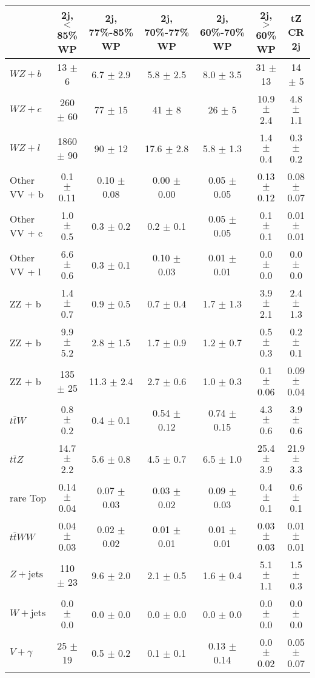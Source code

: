 \begin{tabular}{|l|c|c|c|c|c|c|}
\hline 
 & {2j, $<$85\% WP} & {2j, 77\%-85\% WP} & {2j, 70\%-77\% WP} & {2j, 60\%-70\% WP} & {2j, $>$60\% WP} & {tZ CR 2j}\\
\hline 
  $WZ + b$   & 13 $\pm$ 6 & 6.7 $\pm$ 2.9 & 5.8 $\pm$ 2.5 & 8.0 $\pm$ 3.5 & 31 $\pm$ 13 & 14 $\pm$ 5 \\ 
  $WZ + c$   & 260 $\pm$ 60 & 77 $\pm$ 15 & 41 $\pm$ 8 & 26 $\pm$ 5 & 10.9 $\pm$ 2.4 & 4.8 $\pm$ 1.1 \\ 
  $WZ + l$   & 1860 $\pm$ 90 & 90 $\pm$ 12 & 17.6 $\pm$ 2.8 & 5.8 $\pm$ 1.3 & 1.4 $\pm$ 0.4 & 0.3 $\pm$ 0.2 \\ 
  Other VV + b   & 0.1 $\pm$ 0.11 & 0.10 $\pm$ 0.08 & 0.00 $\pm$ 0.00 & 0.05 $\pm$ 0.05 & 0.13 $\pm$ 0.12 & 0.08 $\pm$ 0.07 \\ 
  Other VV + c  & 1.0 $\pm$ 0.5 & 0.3 $\pm$ 0.2 & 0.2 $\pm$ 0.1 & 0.05 $\pm$ 0.05 & 0.1 $\pm$ 0.1 & 0.01 $\pm$ 0.01 \\ 
  Other VV + l   & 6.6 $\pm$ 0.6 & 0.3 $\pm$ 0.1 & 0.10 $\pm$ 0.03 & 0.01 $\pm$ 0.01 & 0.0 $\pm$ 0.0 & 0.0 $\pm$ 0.0 \\ 
  ZZ + b   & 1.4 $\pm$ 0.7 & 0.9 $\pm$ 0.5 & 0.7 $\pm$ 0.4 & 1.7 $\pm$ 1.3 & 3.9 $\pm$ 2.1 & 2.4 $\pm$ 1.3 \\ 
  ZZ + b  & 9.9 $\pm$ 5.2 & 2.8 $\pm$ 1.5 & 1.7 $\pm$ 0.9 & 1.2 $\pm$ 0.7 & 0.5 $\pm$ 0.3 & 0.2 $\pm$ 0.1 \\ 
  ZZ + b  & 135 $\pm$ 25 & 11.3 $\pm$ 2.4 & 2.7 $\pm$ 0.6 & 1.0 $\pm$ 0.3 & 0.1 $\pm$ 0.06 & 0.09 $\pm$ 0.04 \\ 
  $t\bar{t}W$   & 0.8 $\pm$ 0.2 & 0.4 $\pm$ 0.1 & 0.54 $\pm$ 0.12 & 0.74 $\pm$ 0.15 & 4.3 $\pm$ 0.6 & 3.9 $\pm$ 0.6 \\ 
  $t\bar{t}Z$   & 14.7 $\pm$ 2.2 & 5.6 $\pm$ 0.8 & 4.5 $\pm$ 0.7 & 6.5 $\pm$ 1.0 & 25.4 $\pm$ 3.9 & 21.9 $\pm$ 3.3 \\ 
  rare Top   & 0.14 $\pm$ 0.04 & 0.07 $\pm$ 0.03 & 0.03 $\pm$ 0.02 & 0.09 $\pm$ 0.03 & 0.4 $\pm$ 0.1 & 0.6 $\pm$ 0.1 \\ 
  $t\bar{t}WW$   & 0.04 $\pm$ 0.03 & 0.02 $\pm$ 0.02 & 0.01 $\pm$ 0.01 & 0.01 $\pm$ 0.01 & 0.03 $\pm$ 0.03 & 0.01 $\pm$ 0.01 \\ 
  $Z+\text{jets}$   & 110 $\pm$ 23 & 9.6 $\pm$ 2.0 & 2.1 $\pm$ 0.5 & 1.6 $\pm$ 0.4 & 5.1 $\pm$ 1.1 & 1.5 $\pm$ 0.3 \\ 
  $W+\text{jets}$   & 0.0 $\pm$ 0.0 & 0.0 $\pm$ 0.0 & 0.0 $\pm$ 0.0 & 0.0 $\pm$ 0.0 & 0.0 $\pm$ 0.0 & 0.0 $\pm$ 0.0 \\ 
  $V+\gamma$   & 25 $\pm$ 19 & 0.5 $\pm$ 0.2 & 0.1 $\pm$ 0.1 & 0.13 $\pm$ 0.14 & 0.0 $\pm$ 0.02 & 0.05 $\pm$ 0.07 \\ 

\end{tabular}
